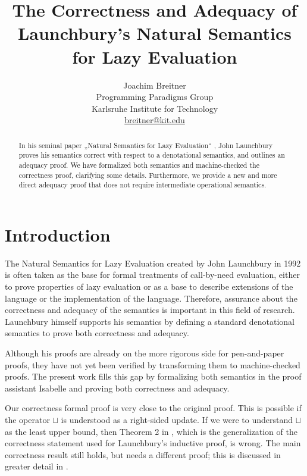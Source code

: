 \documentclass[11pt,a4paper,parskip=half]{scrartcl}
\begin{document}
\title{The Correctness and Adequacy of Launchbury's Natural Semantics for Lazy Evaluation}
\author{Joachim Breitner\\
Programming Paradigms Group\\
Karlsruhe Institute for Technology\\
\url{breitner@kit.edu}}
\maketitle

\begin{abstract}
In his seminal paper „Natural Semantics for Lazy Evaluation“ \cite{launchbury},
John Launchbury proves his semantics correct with respect to a denotational
semantics, and outlines an adequacy proof.
We have formalized both semantics and machine-checked the correctness proof,
clarifying some details.
Furthermore, we provide a new and more direct adequacy proof that does not
require intermediate operational semantics.
\end{abstract}

\tableofcontents

\section{Introduction}

The Natural Semantics for Lazy Evaluation \cite{launchbury} created by John Launchbury in 1992 is often taken as the base for formal treatments of call-by-need evaluation, either to prove properties of lazy evaluation or as a base to describe extensions of the language or the implementation of the language. Therefore, assurance about the correctness and adequacy of the semantics is important in this field of research. Launchbury himself supports his semantics by defining a standard denotational semantics to prove both correctness and adequacy.

Although his proofs are already on the more rigorous side for pen-and-paper proofs, they have not yet been verified by transforming them to machine-checked proofs.
The present work fills this gap by formalizing both semantics in the proof assistant Isabelle and proving both correctness and adequacy.

Our correctness formal proof is very close to the original proof. This is possible if the operator $\sqcup$ is understood as a right-sided update. If we were to understand $\sqcup$ as the least upper bound, then Theorem 2 in \cite{launchbury}, which is the generalization of the correctness statement used for Launchbury's inductive proof, is wrong. The main correctness result still holds, but needs a different proof; this is discussed in greater detail in \cite{breitner2013}.
\end{document}
